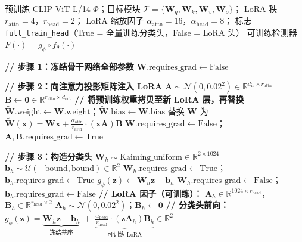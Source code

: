\documentclass[12pt]{article}
\begin{document}
\clearpage
\begin{algorithm}[p]
\caption{模型架构：CLIP ViT-L/14 + LoRA 适配}
\label{alg:model}
\begin{algorithmic}[1]
\Require
  预训练 CLIP ViT-L/14 $\Phi$；目标模块 $\mathcal{T} = \{\mathbf{W}_q, \mathbf{W}_k, \mathbf{W}_v, \mathbf{W}_o\}$；
  LoRA 秩 $r_{\text{attn}} = 4$，$r_{\text{head}} = 2$；
  LoRA 缩放因子 $\alpha_{\text{attn}} = 16$，$\alpha_{\text{head}} = 8$；
  标志 \texttt{full\_train\_head}（True = 全量训练分类头，False = LoRA 头）
\Ensure
  可训练检测器 $F(\cdot) = g_\phi \circ f_\theta(\cdot)$

\State \textbf{// 步骤 1：冻结骨干网络全部参数}
  \State $\mathbf{W}.\text{requires\_grad} \gets \text{False}$
\EndFor

\State \textbf{// 步骤 2：向注意力投影矩阵注入 LoRA}
    \State $\mathbf{A} \sim \mathcal{N}(0, 0.02^2) \in \mathbb{R}^{d_{\text{in}} \times r_{\text{attn}}}$
    \State $\mathbf{B} \gets \mathbf{0} \in \mathbb{R}^{r_{\text{attn}} \times d_{\text{out}}}$
    \State \textbf{// 将预训练权重拷贝至新 LoRA 层，再替换}
    \State $\widetilde{\mathbf{W}}.\text{weight} \gets \mathbf{W}.\text{weight}$；\quad $\widetilde{\mathbf{W}}.\text{bias} \gets \mathbf{W}.\text{bias}$
    \State 替换 $\mathbf{W}$ 为 $\widetilde{\mathbf{W}}(\mathbf{x}) = \mathbf{W}\mathbf{x} + \frac{\alpha_{\text{attn}}}{r_{\text{attn}}} \cdot (\mathbf{x}\mathbf{A})\mathbf{B}$
    \State $\mathbf{W}.\text{requires\_grad} \gets \text{False}$；\quad $\mathbf{A},\mathbf{B}.\text{requires\_grad} \gets \text{True}$
  \EndIf
\EndFor

\State \textbf{// 步骤 3：构造分类头}
\State $\mathbf{W}_h \sim \text{Kaiming\_uniform} \in \mathbb{R}^{2 \times 1024}$
\State $\mathbf{b}_h \sim \mathcal{U}(-\text{bound}, \text{bound}) \in \mathbb{R}^{2}$
  \State $\mathbf{W}_h.\text{requires\_grad} \gets \text{True}$；\quad $\mathbf{b}_h.\text{requires\_grad} \gets \text{True}$
  \State $g_\phi(\mathbf{z}) \gets \mathbf{W}_h\mathbf{z} + \mathbf{b}_h$ 
\Else
  \State $\mathbf{W}_h.\text{requires\_grad} \gets \text{False}$；\quad $\mathbf{b}_h.\text{requires\_grad} \gets \text{False}$
  \State \textbf{// LoRA 因子（可训练）：} $\mathbf{A}_h \in \mathbb{R}^{1024 \times r_{\text{head}}}$，$\mathbf{B}_h \in \mathbb{R}^{r_{\text{head}} \times 2}$
  \State $\mathbf{A}_h \sim \mathcal{N}(0, 0.02^2)$；\quad $\mathbf{B}_h \gets \mathbf{0}$
  \State \textbf{// 分类头前向：} $g_\phi(\mathbf{z}) = \underbrace{\mathbf{W}_h\mathbf{z} + \mathbf{b}_h}_{\text{冻结基座}} \;+\; \underbrace{\frac{\alpha_{\text{head}}}{r_{\text{head}}} \cdot (\mathbf{z}\mathbf{A}_h)\mathbf{B}_h}_{\text{可训练 LoRA}} \in \mathbb{R}^{2}$
\EndIf


\end{algorithmic}
\end{algorithm}
\end{document}
